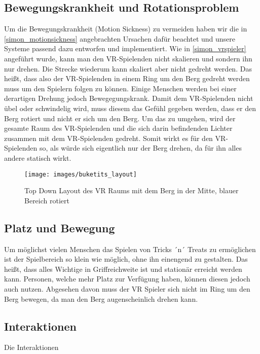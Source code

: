 \subsection{Bewegungskrankheit und Rotationsproblem}
Um die Bewegungskrankheit (Motion Sickness) zu vermeiden haben wir die in \ref{simon_motionsickness} angebrachten Ursachen dafür beachtet und unsere Systeme passend dazu entworfen und implementiert.
Wie in \ref{simon_vrspieler} angeführt wurde, kann man den VR-Spielenden nicht skalieren und sondern ihn nur drehen. Die Strecke wiederum kann skaliert aber nicht gedreht werden. Das heißt, dass also der VR-Spielenden in einem Ring um den Berg gedreht werden muss um den Spielern folgen zu können. Einige Menschen werden bei einer derartigen Drehung jedoch Bewegegungskrank. Damit dem VR-Spielenden nicht übel oder schwindelig wird, muss diesem das Gefühl gegeben werden, dass er den Berg rotiert und nicht er sich um den Berg. Um das zu umgehen, wird der gesamte Raum des VR-Spielenden und die sich darin befindenden Lichter zusammen mit dem VR-Spielenden gedreht. Somit wirkt es für den VR-Spielenden so, als würde sich eigentlich nur der Berg drehen, da für ihn alles andere statisch wirkt.

\begin{figure}[h]
	\centering
	\texttt{[image: images/buketits\_layout]}
	\caption{Top Down Layout des VR Raums mit dem Berg in der Mitte, blauer Bereich rotiert}
\end{figure}



\subsection{Platz und Bewegung}
Um möglichst vielen Menschen das Spielen von Tricks ´n´ Treats zu ermöglichen ist der Spielbereich so klein wie möglich, ohne ihn einengend zu gestalten. Das heißt, dass alles Wichtige in Griffreichweite ist und stationär erreicht werden kann. Personen, welche mehr Platz zur Verfügung haben, können diesen jedoch auch nutzen. Abgesehen davon muss der VR Spieler sich nicht im Ring um den Berg bewegen, da man den Berg augenscheinlich drehen kann.

\subsection{Interaktionen}
Die Interaktionen